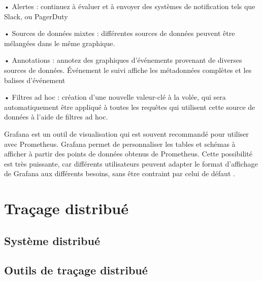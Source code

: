 • Alertes : continuez à évaluer et à envoyer des systèmes de notification tels que Slack, ou PagerDuty

• Sources de données mixtes : différentes sources de données peuvent être mélangées dans le même graphique.

• Annotations : annotez des graphiques d'événements provenant de diverses sources de données. Événement le suivi affiche les métadonnées complètes et les balises d'événement

• Filtres ad hoc : création d'une nouvelle valeur-clé à la volée, qui sera automatiquement être appliqué à toutes les requêtes qui utilisent cette source de données à l'aide de filtres ad hoc.

Grafana est un outil de visualisation qui est souvent recommandé pour utiliser avec Prometheus. Grafana permet de personnaliser les tables et schémas à afficher à partir des points de données obtenus de Prometheus. Cette possibilité est très puissante, car différents utilisateurs peuvent adapter le format d'affichage de Grafana aux différents besoins, sans être contraint
par celui de défaut \cite{Na_2020s}.




\section{Traçage distribué}

\subsection{Système distribué}

\subsection{Outils de traçage distribué}


